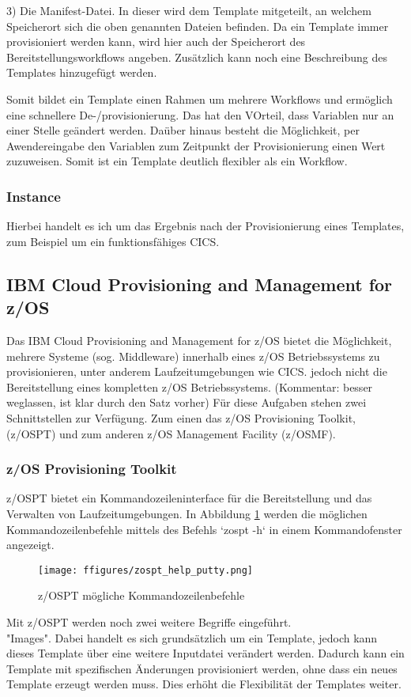 3) Die Manifest-Datei.
In dieser wird dem Template mitgeteilt, an welchem Speicherort sich die oben genannten Dateien befinden.
Da ein Template immer provisioniert werden kann, wird hier auch der Speicherort des Bereitstellungsworkflows angeben.
Zusätzlich kann noch eine Beschreibung des Templates hinzugefügt werden.

Somit bildet ein Template einen Rahmen um mehrere Workflows und ermöglich eine schnellere De-/provisionierung.
Das hat den VOrteil, dass Variablen nur an einer Stelle geändert werden.
Daüber hinaus besteht die Möglichkeit, per Awendereingabe den Variablen zum Zeitpunkt der Provisionierung einen Wert zuzuweisen.
Somit ist ein Template deutlich flexibler als ein Workflow.
\cite{IBM.2019}

\subsubsection{Instance}
Hierbei handelt es ich um das Ergebnis nach der Provisionierung eines Templates,
zum Beispiel um ein funktionsfähiges CICS.

\subsection{IBM Cloud Provisioning and Management for z/OS}
Das IBM Cloud Provisioning and Management for z/OS bietet die Möglichkeit, mehrere Systeme (sog. Middleware) innerhalb eines z/OS Betriebssystems zu provisionieren, unter anderem Laufzeitumgebungen wie CICS. 
jedoch nicht die Bereitstellung eines kompletten z/OS Betriebssystems. (Kommentar: besser weglassen, ist klar durch den Satz vorher)
Für diese Aufgaben stehen zwei Schnittstellen zur Verfügung.
Zum einen das z/OS Provisioning Toolkit, (z/OSPT) und zum anderen z/OS Management Facility (z/OSMF).
\cite{KeithWinnardGaryPuchkoffHirenShah.2016}

\subsubsection{z/OS Provisioning Toolkit}\label{sssec:zospt}
z/OSPT bietet ein Kommandozeileninterface für die Bereitstellung und das Verwalten von Laufzeitumgebungen.
In Abbildung \ref{fig:zospt_help} werden die möglichen Kommandozeilenbefehle mittels des Befehls `zospt -h` in einem Kommandofenster angezeigt.
\begin{figure}[h]
	\centering
	\texttt{[image: ffigures/zospt\_help\_putty.png]}
	\caption{z/OSPT mögliche Kommandozeilenbefehle}
	\label{fig:zospt_help}
\end{figure}
Mit z/OSPT werden noch zwei weitere Begriffe eingeführt.\\
"Images".
Dabei handelt es sich grundsätzlich um ein Template, jedoch kann dieses Template über eine weitere Inputdatei verändert werden.
Dadurch kann ein Template mit spezifischen Änderungen provisioniert werden, ohne dass ein neues Template erzeugt werden muss.
Dies erhöht die Flexibilität der Templates weiter.\\

